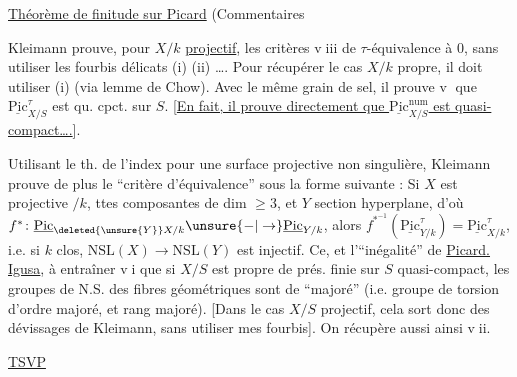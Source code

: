 \uline{Théorème de finitude sur Picard} (Commentaires

Kleimann prouve, pour $X/k$ \uline{projectif}, les critères \textcircled{\scriptsize viii} de $\tau$-équivalence à $0$, sans utiliser les fourbis délicats (i) (ii) \ldots. Pour récupérer le cas $X/k$ propre, il doit utiliser (i) (via lemme de Chow). Avec le même grain de sel, il prouve \textcircled{\scriptsize v} que $\underline{\mathrm{Pic}}^\tau_{X/S}$ est qu. cpct. sur $S$. [\uline{En fait, il prouve directement que $\underline{\mathrm{Pic}}^{\mathrm{num}}_{X/S}$ est quasi-compact\ldots.}].

Utilisant le th. de l'index pour une surface projective non singulière, Kleimann prouve de plus le ``critère d'équivalence'' sous la forme suivante : Si $X$ est projective $/k$, ttes  composantes de dim $\geq3$, et $Y$ section hyperplane, d'où $f^*\colon\underline{\mathrm{Pic}}_{\deleted{\unsure{Y}}X/k}\unsure{-|\to}\underline{\mathrm{Pic}}_{Y/k}$, alors $f^{*^{-1}}(\underline{\mathrm{Pic}}^\tau_{Y/k})=\underline{\mathrm{Pic}}^\tau_{X/k}$, i.e. si $k$  clos, $\mathrm{NSL}(X)\to\mathrm{NSL}(Y)$ est injectif. Ce, et l'``inégalité'' de \uline{Picard. Igusa},   à entraîner \textcircled{\scriptsize vi} que si $X/S$ est propre de prés. finie sur  $S$ quasi-compact, les groupes de N.S. des fibres géométriques sont de   ``majoré''  (i.e. groupe de torsion d'ordre majoré, et rang majoré). [Dans le cas $X/S$ projectif, cela sort donc des dévissages de Kleimann, sans utiliser mes fourbis]. On récupère aussi ainsi \textcircled{\scriptsize vii}.

\uline{TSVP}

